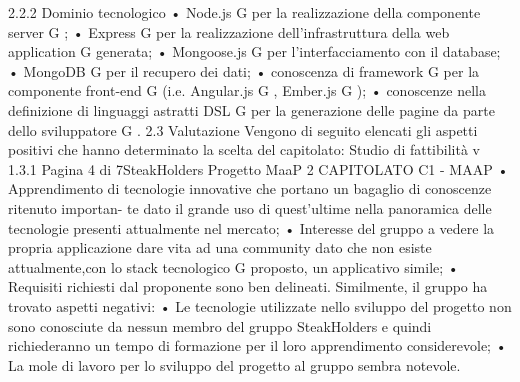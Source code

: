 2.2.2
Dominio tecnologico
• Node.js G per la realizzazione della componente server G ;
• Express G per la realizzazione dell’infrastruttura della web application G generata;
• Mongoose.js G per l’interfacciamento con il database;
• MongoDB G per il recupero dei dati;
• conoscenza di framework G per la componente front-end G (i.e. Angular.js G , Ember.js G );
• conoscenze nella definizione di linguaggi astratti DSL G per la generazione delle pagine da parte
dello sviluppatore G .
2.3
Valutazione
Vengono di seguito elencati gli aspetti positivi che hanno determinato la scelta del capitolato:
Studio di fattibilità
v 1.3.1
Pagina 4 di 7SteakHolders
Progetto MaaP
2
CAPITOLATO C1 - MAAP
• Apprendimento di tecnologie innovative che portano un bagaglio di conoscenze ritenuto importan-
te dato il grande uso di quest’ultime nella panoramica delle tecnologie presenti attualmente nel
mercato;
• Interesse del gruppo a vedere la propria applicazione dare vita ad una community dato che non
esiste attualmente,con lo stack tecnologico G proposto, un applicativo simile;
• Requisiti richiesti dal proponente sono ben delineati.
Similmente, il gruppo ha trovato aspetti negativi:
• Le tecnologie utilizzate nello sviluppo del progetto non sono conosciute da nessun membro del
gruppo SteakHolders e quindi richiederanno un tempo di formazione per il loro apprendimento
considerevole;
• La mole di lavoro per lo sviluppo del progetto al gruppo sembra notevole.